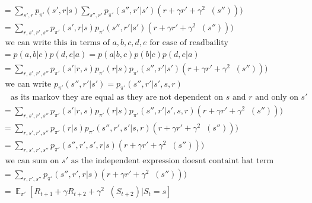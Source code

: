 \documentclass{article}
\DeclareMathOperator{\vp}{v_\pi} %
\DeclareMathOperator{\E}{\mathds{E}}
\begin{document}
\begin{align*}
	& = \sum_{s',r} p_{\pi'}(s',r|s ) \sum_{s'',r'} p_{\pi'}(s'',r'|s' ) (r +  \gamma  r' + \gamma^2 \vp(s'') ) )\\
	& = \sum_{r, s',r', s''} p_{\pi'}(s',r|s ) p_{\pi'}(s'',r'|s' ) (r +  \gamma  r' + \gamma^2 \vp(s'') ) )\\
	& \text{ we can write this in terms of $a,b,c,d,e$ for ease of readbaility}\\
	& = p(a,b | c) p(d, e | a)= p(a|b, c) p(b|c) p(d, e|a) \\
	& = \sum_{r, s',r', s''} p_{\pi'}(s'|r,s ) p_{\pi'}(r|s) p_{\pi'}(s'',r'|s' ) (r +  \gamma  r' + \gamma^2 \vp(s'') ) )\\
	& \text{ we can write $p_{\pi'}(s'',r'|s' ) = p_{\pi'}(s'',r'|s' , s, r)$ }\\& \quad \text{as its markov they are equal as they are not dependent on $s$ and $r$ and only on $s'$}\\
	& = \sum_{r, s',r', s''} p_{\pi'}(s'|r,s ) p_{\pi'}(r|s) p_{\pi'}(s'',r'|s' , s, r) (r +  \gamma  r' + \gamma^2 \vp(s'') ) )\\
	& = \sum_{r, s',r', s''}  p_{\pi'}(r|s) p_{\pi'}(s'',r',s'|  s, r) (r +  \gamma  r' + \gamma^2 \vp(s'') ) )\\
	& = \sum_{r, s',r', s''}   p_{\pi'}(s'',r',s', r|  s) (r +  \gamma  r' + \gamma^2 \vp(s'') ) )\\
	& \text{ we can sum on $s'$ as the independent expression doesnt containt hat term}\\
	& = \sum_{r,r', s''}   p_{\pi'}(s'',r', r|  s) (r +  \gamma  r' + \gamma^2 \vp(s'') ) )\\
	& = \E_{\pi'} [R_{t+1} + \gamma R_{t+2} + \gamma^2 \vp(S_{t+2}) | S_t = s]
\end{align*}



\end{document}
